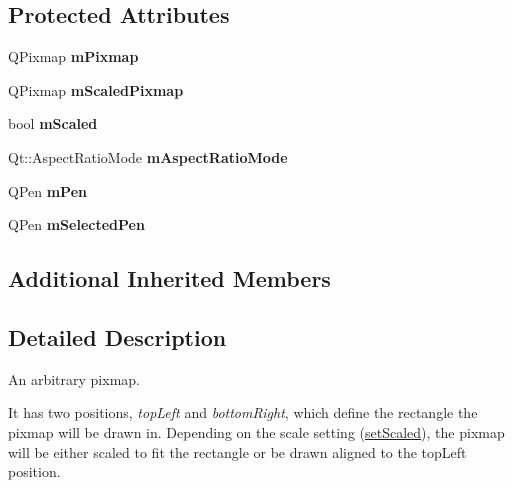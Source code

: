 \subsection*{Protected Attributes}
\begin{DoxyCompactItemize}
\item 
\hypertarget{classQCPItemPixmap_a1396cce7f26c7b8e9512906284380c4d}{Q\-Pixmap {\bfseries m\-Pixmap}}\label{classQCPItemPixmap_a1396cce7f26c7b8e9512906284380c4d}

\item 
\hypertarget{classQCPItemPixmap_a2ebc66e15b9f1264563d58f29ba1bc00}{Q\-Pixmap {\bfseries m\-Scaled\-Pixmap}}\label{classQCPItemPixmap_a2ebc66e15b9f1264563d58f29ba1bc00}

\item 
\hypertarget{classQCPItemPixmap_a8fe670a529cd46a9b8afd9fc1203bc3f}{bool {\bfseries m\-Scaled}}\label{classQCPItemPixmap_a8fe670a529cd46a9b8afd9fc1203bc3f}

\item 
\hypertarget{classQCPItemPixmap_a8dc6b6c1e106ac523efae22d5fe55bab}{Qt\-::\-Aspect\-Ratio\-Mode {\bfseries m\-Aspect\-Ratio\-Mode}}\label{classQCPItemPixmap_a8dc6b6c1e106ac523efae22d5fe55bab}

\item 
\hypertarget{classQCPItemPixmap_acfee1124eb51a1887aaf8de10777c7a1}{Q\-Pen {\bfseries m\-Pen}}\label{classQCPItemPixmap_acfee1124eb51a1887aaf8de10777c7a1}

\item 
\hypertarget{classQCPItemPixmap_a0949e5bb6a261fc4e9668e28e2effcfa}{Q\-Pen {\bfseries m\-Selected\-Pen}}\label{classQCPItemPixmap_a0949e5bb6a261fc4e9668e28e2effcfa}

\end{DoxyCompactItemize}
\subsection*{Additional Inherited Members}


\subsection{Detailed Description}
An arbitrary pixmap. 

 It has two positions, {\itshape top\-Left} and {\itshape bottom\-Right}, which define the rectangle the pixmap will be drawn in. Depending on the scale setting (\hyperlink{classQCPItemPixmap_aea813ff1b12163ae5d3ac182593b1d6f}{set\-Scaled}), the pixmap will be either scaled to fit the rectangle or be drawn aligned to the top\-Left position.

